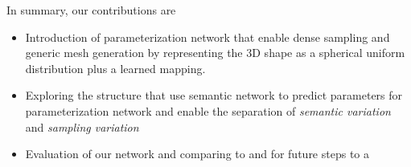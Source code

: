 In summary, our contributions are
\begin{itemize}
	\item  Introduction of parameterization network that enable dense sampling and generic mesh generation by representing the 3D shape as a spherical uniform distribution plus a learned mapping.
	\item  Exploring the structure that use semantic network to predict parameters for parameterization network and enable the separation of \textit{semantic variation} and \textit{sampling variation}
	\item Evaluation of our network and comparing to and for future steps to a 

\end{itemize}          

